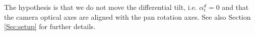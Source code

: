 The hypothesis is that we do not move the differential tilt, i.e. 
$\alpha_t^d = 0$ and that the camera optical axes are aligned 
with the pan rotation axes. See also Section \ref{Sec:setup} 
for further details.